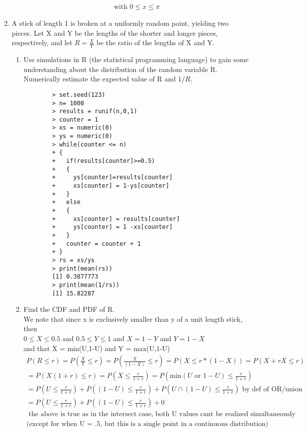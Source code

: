 \documentclass[11pt]{article}
\begin{document}
\begin{enumerate}
\begin{enumerate}
\begin{gather}
		\\
		\text{with } 0 \le x \le \pi
	\end{gather}
\end{enumerate}
\item A stick of length 1 is broken at a uniformly random point, yielding two pieces. Let X and Y be the lengths
of the shorter and longer pieces, respectively, and let $R = \frac{X}{Y}$ be the ratio of the lengths of X and Y.
\begin{enumerate}
	\item  Use simulations in R (the statistical programming language) to gain some understanding about the distribution of the random variable R. Numerically estimate the expected value of R and $1/R$.
	\begin{verbatim}
		> set.seed(123)
		> n= 1000
		> results = runif(n,0,1)
		> counter = 1
		> xs = numeric(0)
		> ys = numeric(0)
		> while(counter <= n)
		+ {
		+   if(results[counter]>=0.5)
		+   {
		+     ys[counter]=results[counter]
		+     xs[counter] = 1-ys[counter]
		+   }
		+   else
		+   {
		+     xs[counter] = results[counter]
		+     ys[counter] = 1 -xs[counter]
		+   }
		+   counter = counter + 1
		+ }
		> rs = xs/ys
		> print(mean(rs))
		[1] 0.3877773
		> print(mean(1/rs))
		[1] 15.82287
	\end{verbatim}
	\item Find the CDF and PDF of R.\\
	We note that since x is exclusively smaller than y of a unit length stick, then \\
	$0\le X \le 0.5$ and $0.5 \le Y \le 1$ and $X = 1-Y $ and $Y= 1-X$\\
	and that X = min(U,1-U) and Y = max(U,1-U)
	\begin{gather}
		P(R \le r) = P(\frac{X}{Y} \le r) =  P(\frac{X}{(1-X)} \le r) = P(X \le r*(1-X)) = P(X + rX \le r) \\
		= P(X(1+r) \le r) = P(X \le \frac{r}{1+r}) = P(\text{min}(U \text{ or }1-U) \le \frac{r}{1+r}) \\
		= P(U\le \frac{r}{1+r}) + P((1-U) \le \frac{r}{1+r}) + P(U\cap(1-U)\le \frac{r}{1+r}) \text{ by def of OR/union} \\
		= P(U\le \frac{r}{1+r}) + P((1-U) \le \frac{r}{1+r}) + 0 \\
		\text{ the above is true as in the intersect case, both U values cant be realized simultaneously}\\
		\text{(except for when U = .5, but this is a single point in a continuous distribution)}\\

\end{gather}
\end{enumerate}
\end{enumerate}
\end{document}
